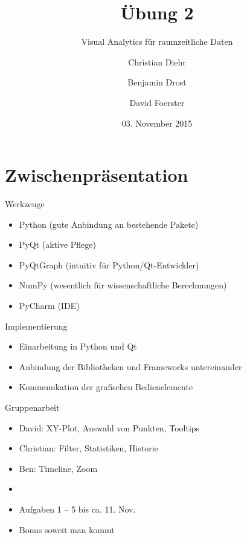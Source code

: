 \documentclass{beamer}
\title{Übung 2}
\subtitle{Visual Analytics für raumzeitliche Daten}
\author{Christian Diehr \and Benjamin Drost \and David Foerster}
\institute{Institut für Informatik\\Humboldt-Universität zu Berlin}
\date{03. November 2015}
\begin{document}
    \begin{frame}
        \titlepage
    \end{frame}
    \logo{} %
    
    \section{Zwischenpräsentation}
    \begin{frame}{Werkzeuge}
        \begin{itemize}
	        \setlength\itemsep{1em}
        	\item Python (gute Anbindung an bestehende Pakete)
        	\item PyQt (aktive Pflege)
        	\item PyQtGraph (intuitiv für Python/Qt-Entwickler)
        	\item NumPy (wesentlich für wissenschaftliche Berechnungen)
        	\item PyCharm (IDE)
        \end{itemize}
    \end{frame}
    
    \begin{frame}{Implementierung}
    	\begin{itemize}
	        \setlength\itemsep{1em}
	        \item Einarbeitung in Python und Qt
	        \item Anbindung der Bibliotheken und Frameworks untereinander
    		\item Kommunikation der grafischen Bedienelemente
    	\end{itemize}
    \end{frame}
    
    \begin{frame}{Gruppenarbeit}
    	\begin{itemize}
    		\setlength\itemsep{1em}
    		\item David: XY-Plot, Auswahl von Punkten, Tooltips
    		\item Christian: Filter, Statistiken, Historie
    		\item Ben: Timeline, Zoom
    		\item[]
    		\item Aufgaben 1 -- 5 bis ca. 11. Nov.
    		\item Bonus soweit man kommt
    	\end{itemize}
    \end{frame}
    
\end{document}
